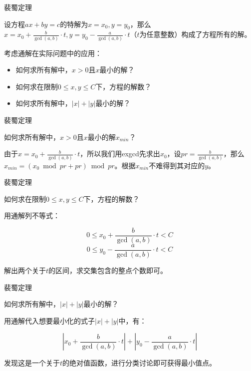\documentclass{ctexbeamer}        %
\begin{document}
\begin{frame}{裴蜀定理}

\begin{theorem}
    设方程$ax+by=c$的特解为$x=x_0,y=y_0$，那么$x=x_0+\frac{b}{\gcd(a,b)} \cdot t,y=y_0-\frac{a}{\gcd(a,b)} \cdot t$（$t$为任意整数）构成了方程所有的解。
\end{theorem}

考虑通解在实际问题中的应用：

\begin{itemize}
    \item 如何求所有解中，$x>0$且$x$最小的解？
    \item 如何求在限制$0\le x,y \le C$下，方程的解数？
    \item 如何求所有解中，$|x|+|y|$最小的解？
\end{itemize}

\end{frame}

\begin{frame}{裴蜀定理}

\begin{example}
    如何求所有解中，$x>0$且$x$最小的解$x_{min}$？
\end{example}

由于$x=x_0+\frac{b}{\gcd(a,b)} \cdot t$，所以我们用exgcd先求出$x_0$，设$pr=\frac{b}{\gcd(a,b)}$，那么$x_{min}=(x_0 \bmod pr + pr) \bmod pr$。根据$x_{min}$不难得到其对应的$y$。

\end{frame}

\begin{frame}{裴蜀定理}

\begin{example}
    如何求在限制$0\le x,y \le C$下，方程的解数？
\end{example}

用通解列不等式：

$$0 \le x_0+\frac{b}{\gcd(a,b)} \cdot t < C$$
$$0 \le y_0-\frac{a}{\gcd(a,b)} \cdot t < C$$

解出两个关于$t$的区间，求交集包含的整点个数即可。
\end{frame}

\begin{frame}{裴蜀定理}

\begin{example}[poj2142]
    如何求所有解中，$|x|+|y|$最小的解？
\end{example}

用通解代入想要最小化的式子$|x|+|y|$中，有：

$$|x_0+\frac{b}{\gcd(a,b)} \cdot t| + |y_0-\frac{a}{\gcd(a,b)} \cdot t|$$

发现这是一个关于$t$的绝对值函数，进行分类讨论即可获得最小值点。
\end{frame}
\end{document}
